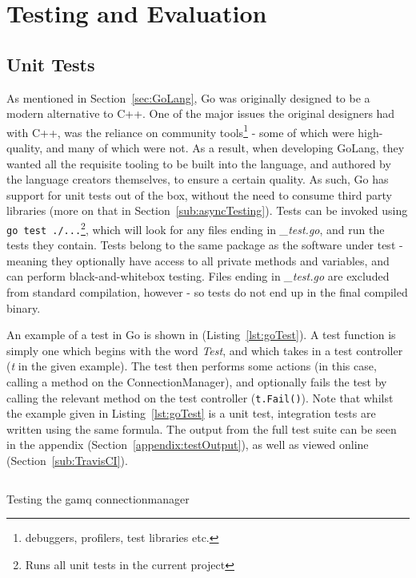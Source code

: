 \chapter{Testing and Evaluation}
\label{chap:Testing and Evaluation}

\section{Unit Tests}
\label{sec:Unit Tests}

As mentioned in Section~\ref{sec:GoLang}, Go was originally designed to be a
modern alternative to C++. One of the major issues the original designers had
with C++, was the reliance on community tools\footnote{debuggers, profilers,
test libraries etc.} - some of which were high-quality, and many of which were
not. As a result, when developing GoLang, they wanted all the requisite tooling
to be built into the language, and authored by the language creators themselves,
to ensure a certain quality. As such, Go has support for unit tests out of the
box, without the need to consume third party libraries (more on that in
Section~\ref{sub:asyncTesting}). Tests can be invoked using \texttt{go
test ./...}\footnote{Runs all unit tests in the current project}, which will
look for any files ending in \emph{\_test.go}, and run the tests they contain.
Tests belong to the same package as the software under test - meaning they
optionally have access to all private methods and variables, and can perform
black-and-whitebox testing. Files ending in \emph{\_test.go} are excluded from
standard compilation, however - so tests do not end up in the final compiled
binary.

An example of a test in Go is shown in (Listing~\ref{lst:goTest}). A test
function is simply one which begins with the word \emph{Test}, and which takes
in a test controller (\emph{t} in the given example). The test then performs
some actions (in this case, calling a method on the ConnectionManager), and
optionally fails the test by calling the relevant method on the test controller
(\texttt{t.Fail()}). Note that whilst the example given in
Listing~\ref{lst:goTest} is a unit test, integration tests are written using the
same formula. The output from the full test suite can be seen in the appendix
(Section~\ref{appendix:testOutput}), as well as viewed online
(Section~\ref{sub:TravisCI}).

\begin{listing}[htbp]
  \centering
  \inputminted[firstline=13,lastline=27]{go}{code/gamq/connectionmanager_test.go}
  \caption{Testing the gamq connectionmanager}
  \label{lst:goTest}
\end{listing}

